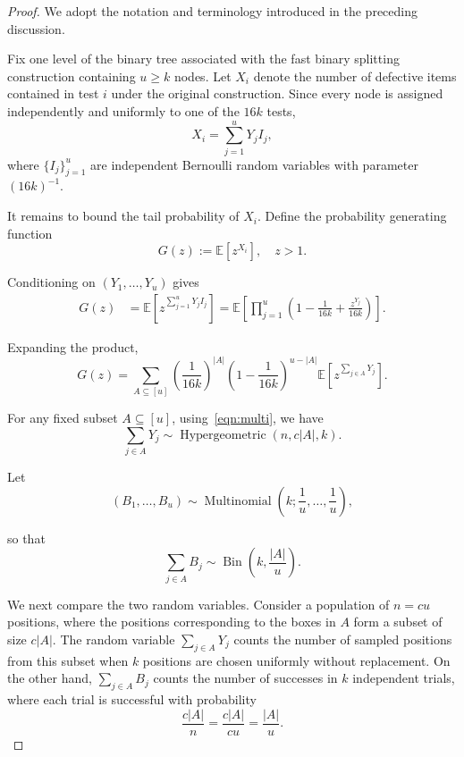 \documentclass{article}
\begin{document}
\begin{proof}
We adopt the notation and terminology introduced in the preceding discussion.

Fix one level of the binary tree associated with the fast binary splitting construction containing $u\geq k$ nodes. Let $X_i$ denote
the number of defective items contained in test $i$ under the original
construction. Since every node is assigned independently and uniformly to one
of the $16k$ tests,
\[
X_i=\sum_{j=1}^{u}Y_jI_j,
\]
where $\{I_j\}_{j=1}^{u}$ are independent Bernoulli random variables with
parameter $(16k)^{-1}$.

It remains to bound the tail probability of $X_i$. Define the probability generating function
\[
G(z):=\mathbb{E}[z^{X_i}],\quad z>1 .
\]

Conditioning on $(Y_1,\ldots,Y_u)$ gives
\[
\begin{aligned}
G(z)
&=
\mathbb{E}
\left[
z^{\sum_{j=1}^{u}Y_jI_j}
\right]
=
\mathbb{E}
\left[
\prod_{j=1}^{u}
\left(
1-\frac1{16k}
+\frac{z^{Y_j}}{16k}
\right)
\right].
\end{aligned}
\]

Expanding the product,
\[
G(z)
=
\sum_{A\subseteq[u]}
\left(\frac1{16k}\right)^{|A|}
\left(1-\frac1{16k}\right)^{u-|A|}
\mathbb{E}
\left[
z^{\sum_{j\in A}Y_j}
\right].
\]





For any fixed subset $A\subseteq [u]$, using~\eqref{eqn:multi}, we have
\[
\sum_{j\in A}Y_j
\sim
\operatorname{Hypergeometric}
\left(
n,c|A|,k
\right).
\]

Let
\[
(B_1,\ldots,B_u)\sim
\operatorname{Multinomial}
\left(k;\frac1u,\ldots,\frac1u\right),
\]

so that
\[
\sum_{j\in A}B_j
\sim
\operatorname{Bin}
\left(
k,\frac{|A|}{u}
\right).
\]

We next compare the two random variables. Consider a population of $n=cu$
positions, where the positions corresponding to the boxes in $A$ form a
subset of size $c|A|$. The random variable $\sum_{j\in A}Y_j$ counts the
number of sampled positions from this subset when $k$ positions are chosen
uniformly without replacement. On the other hand,
$\sum_{j\in A}B_j$ counts the number of successes in $k$ independent trials,
where each trial is successful with probability
\[
\frac{c|A|}{n}=\frac{c|A|}{cu}=\frac{|A|}{u}.
\]


\end{proof}
\end{document}
